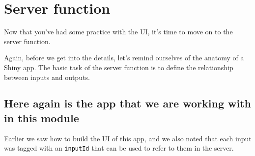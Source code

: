 \documentclass[
  letterpaper,
  DIV=11,
  numbers=noendperiod]{scrreprt}
\newenvironment{Shaded}{\begin{snugshade}}{\end{snugshade}}
\newcommand{\AttributeTok}[1]{\textcolor[rgb]{0.40,0.46,0.14}{#1}}
\newcommand{\CommentTok}[1]{\textcolor[rgb]{0.37,0.37,0.37}{#1}}
\newcommand{\FunctionTok}[1]{\textcolor[rgb]{0.28,0.35,0.67}{#1}}
\newcommand{\NormalTok}[1]{\textcolor[rgb]{0.00,0.46,0.62}{#1}}
\newcommand{\OtherTok}[1]{\textcolor[rgb]{0.00,0.46,0.62}{#1}}
\newcommand{\SpecialCharTok}[1]{\textcolor[rgb]{0.37,0.37,0.37}{#1}}
\begin{document}
\begin{Shaded}
\end{Shaded}

\hypertarget{server-function-1}{%
\section{Server function}\label{server-function-1}}

Now that you've had some practice with the UI, it's time to move on to
the server function.

Again, before we get into the details, let's remind ourselves of the
anatomy of a Shiny app. The basic task of the server function is to
define the relationship between inputs and outputs.

\hypertarget{here-again-is-the-app-that-we-are-working-with-in-this-module-1}{%
\subsection{Here again is the app that we are working with in this
module}\label{here-again-is-the-app-that-we-are-working-with-in-this-module-1}}

Earlier we saw how to build the UI of this app, and we also noted that
each input was tagged with an \texttt{inputId} that can be used to refer
to them in the server.
\end{document}
